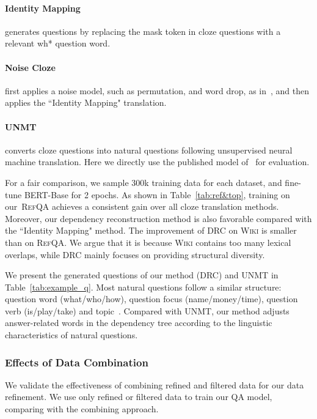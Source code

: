 \documentclass[11pt,a4paper]{article}
\newcommand\refqa{\textsc{RefQA}}
\begin{document}
\paragraph{Identity Mapping} generates questions by replacing the mask token in cloze questions with a relevant wh* question word.


\paragraph{Noise Cloze} first applies a noise model, such as permutation, and word drop, as in~\citet{lample2017unsupervised}, and then applies the ``Identity Mapping" translation.

\paragraph{UNMT} converts cloze questions into natural questions following unsupervised neural machine translation.
Here we directly use the published model of~\citet{lewis2019unsupervisedqa} for evaluation.



For a fair comparison, we sample 300k training data for each dataset, and fine-tune BERT-Base for 2 epochs.
As shown in Table~\ref{tab:ref&top}, training on our~\refqa{} achieves a consistent gain over all cloze translation methods.
Moreover, our dependency reconstruction method is also favorable compared with the ``Identity Mapping" method.
The improvement of DRC on \textsc{Wiki} is smaller than on \refqa{}. We argue that it is because \textsc{Wiki} contains too many lexical overlaps, while DRC mainly focuses on providing structural diversity.

We present the generated questions of our method (DRC) and UNMT in Table~\ref{tab:example_q}. Most natural questions follow a similar structure: question word (what/who/how), question focus (name/money/time), question verb (is/play/take) and topic~\citep{qa:as:ie}. Compared with UNMT, our method adjusts answer-related words in the dependency tree according to the linguistic characteristics of natural questions.





\subsubsection{Effects of Data Combination}


We validate the effectiveness of combining refined and filtered data for our data refinement.
We use only refined or filtered data to train our QA model, comparing with the combining approach.
\end{document}
